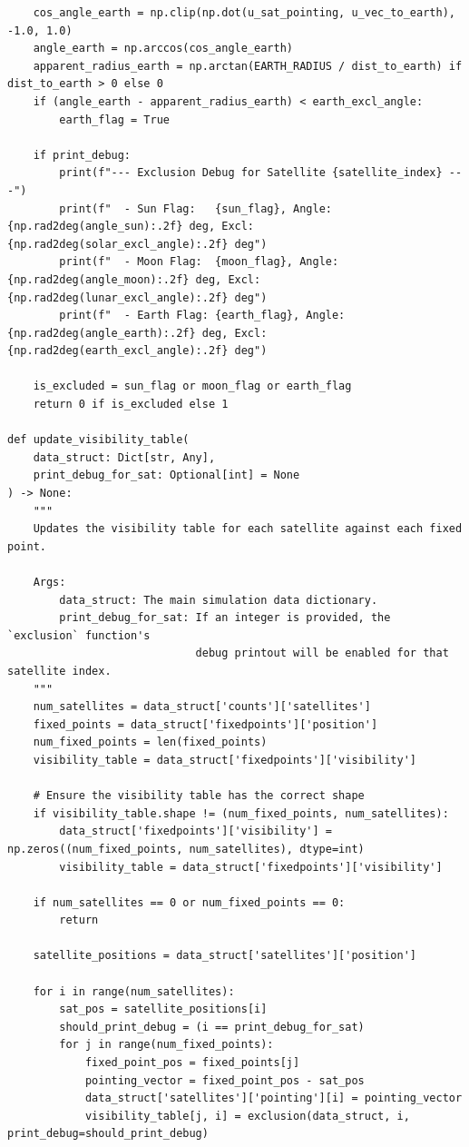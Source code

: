 \documentclass[11pt]{article}
\begin{document}
\begin{Verbatim}
    cos_angle_earth = np.clip(np.dot(u_sat_pointing, u_vec_to_earth), -1.0, 1.0)
    angle_earth = np.arccos(cos_angle_earth)
    apparent_radius_earth = np.arctan(EARTH_RADIUS / dist_to_earth) if dist_to_earth > 0 else 0
    if (angle_earth - apparent_radius_earth) < earth_excl_angle:
        earth_flag = True

    if print_debug:
        print(f"--- Exclusion Debug for Satellite {satellite_index} ---")
        print(f"  - Sun Flag:   {sun_flag}, Angle: {np.rad2deg(angle_sun):.2f} deg, Excl:
{np.rad2deg(solar_excl_angle):.2f} deg")
        print(f"  - Moon Flag:  {moon_flag}, Angle: {np.rad2deg(angle_moon):.2f} deg, Excl:
{np.rad2deg(lunar_excl_angle):.2f} deg")
        print(f"  - Earth Flag: {earth_flag}, Angle: {np.rad2deg(angle_earth):.2f} deg, Excl:
{np.rad2deg(earth_excl_angle):.2f} deg")

    is_excluded = sun_flag or moon_flag or earth_flag
    return 0 if is_excluded else 1

def update_visibility_table(
    data_struct: Dict[str, Any],
    print_debug_for_sat: Optional[int] = None
) -> None:
    """
    Updates the visibility table for each satellite against each fixed point.

    Args:
        data_struct: The main simulation data dictionary.
        print_debug_for_sat: If an integer is provided, the `exclusion` function's
                             debug printout will be enabled for that satellite index.
    """
    num_satellites = data_struct['counts']['satellites']
    fixed_points = data_struct['fixedpoints']['position']
    num_fixed_points = len(fixed_points)
    visibility_table = data_struct['fixedpoints']['visibility']

    # Ensure the visibility table has the correct shape
    if visibility_table.shape != (num_fixed_points, num_satellites):
        data_struct['fixedpoints']['visibility'] = np.zeros((num_fixed_points, num_satellites), dtype=int)
        visibility_table = data_struct['fixedpoints']['visibility']

    if num_satellites == 0 or num_fixed_points == 0:
        return

    satellite_positions = data_struct['satellites']['position']

    for i in range(num_satellites):
        sat_pos = satellite_positions[i]
        should_print_debug = (i == print_debug_for_sat)
        for j in range(num_fixed_points):
            fixed_point_pos = fixed_points[j]
            pointing_vector = fixed_point_pos - sat_pos
            data_struct['satellites']['pointing'][i] = pointing_vector
            visibility_table[j, i] = exclusion(data_struct, i, print_debug=should_print_debug)
\end{Verbatim}
\end{document}
